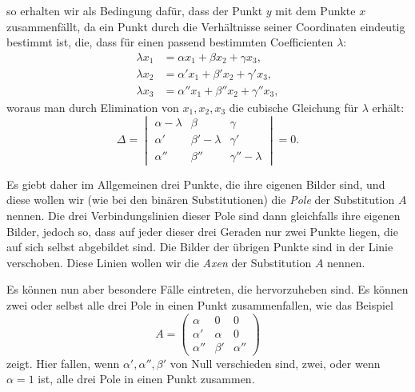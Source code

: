 \documentclass[12pt,a4paper]{article}
\begin{document}
so erhalten wir als Bedingung daf\"ur, dass der Punkt $y$ mit dem Punkte $x$ zusammenf\"allt, da ein Punkt durch die Verh\"altnisse seiner Coordinaten eindeutig bestimmt ist, die, dass f\"ur einen passend bestimmten Coefficienten $\lambda$:
\begin{equation}
\label{eq:polebed} \begin{aligned} \lambda x_1 &= \alpha x_1 + \beta x_2 + \gamma x_3,\\ \lambda x_2 &= \alpha' x_1 + \beta' x_2 + \gamma' x_3,\\ \lambda x_3 &= \alpha'' x_1 + \beta'' x_2 + \gamma'' x_3, \end{aligned}
\end{equation}
woraus man durch Elimination von $x_1, x_2, x_3$ die cubische Gleichung f\"ur $\lambda$ erh\"alt:
\begin{equation}
\label{eq:charakteristisch} \Delta = \begin{vmatrix} \alpha - \lambda & \beta & \gamma \\ \alpha' & \beta' - \lambda & \gamma' \\ \alpha'' & \beta'' & \gamma'' - \lambda \end{vmatrix} = 0.
\end{equation}

Es giebt daher im Allgemeinen drei Punkte, die ihre eigenen Bilder sind, und diese wollen wir (wie bei den bin\"aren Substitutionen) die \textit{Pole} der Substitution $A$ nennen. Die drei Verbindungslinien dieser Pole sind dann gleichfalls ihre eigenen Bilder, jedoch so, dass auf jeder dieser drei Geraden nur zwei Punkte liegen, die auf sich selbst abgebildet sind. Die Bilder der \"ubrigen Punkte sind in der Linie verschoben. Diese Linien wollen wir die \textit{Axen} der Substitution $A$ nennen.

Es k\"onnen nun aber besondere F\"alle eintreten, die hervorzuheben sind. Es k\"onnen zwei oder selbst alle drei Pole in einen Punkt zusammenfallen, wie das Beispiel
\[ A = \begin{pmatrix} \alpha & 0 & 0 \\ \alpha' & \alpha & 0 \\ \alpha'' & \beta' & \alpha'' \end{pmatrix} \]
zeigt. Hier fallen, wenn $\alpha', \alpha'', \beta'$ von Null verschieden sind, zwei, oder wenn $\alpha = 1$ ist, alle drei Pole in einen Punkt zusammen.
\end{document}
